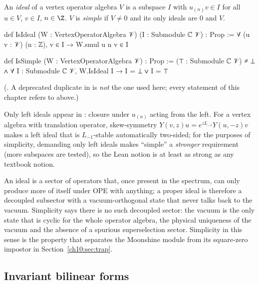 \begin{definition}\label{ch10:def:simple}
An \emph{ideal} of a vertex operator algebra $V$ is a subspace $I$ with $u_{(n)}v\in I$ for all
$u\in V$, $v\in I$, $n\in\Z$.  $V$ is \emph{simple} if $V\neq0$ and its only ideals are $0$ and $V$.
\end{definition}
\begin{leancode}
def IsIdeal (W : VertexOperatorAlgebra 𝒱) (I : Submodule ℂ 𝒱) : Prop :=
  ∀ (u v : 𝒱) (n : ℤ), v ∈ I → W.smul u n v ∈ I

def IsSimple (W : VertexOperatorAlgebra 𝒱) : Prop :=
  (⊤ : Submodule ℂ 𝒱) ≠ ⊥ ∧ ∀ I : Submodule ℂ 𝒱, W.IsIdeal I → I = ⊥ ∨ I = ⊤
\end{leancode}
(.  A deprecated duplicate  in
 is \emph{not} the one used here; every statement of this
chapter refers to  above.)

\begin{dictionary}
Only left ideals appear in : closure under $u_{(n)}$ acting from the left.  For a
vertex algebra with translation operator, skew-symmetry $Y(v,z)u=e^{zL_{-1}}Y(u,-z)v$ makes a left
ideal that is $L_{-1}$-stable automatically two-sided; for the purposes of simplicity, demanding
only left ideals makes ``simple'' a \emph{stronger} requirement (more subspaces are tested), so
the Lean notion is at least as strong as any textbook notion.
\end{dictionary}

\begin{physics}
An ideal is a sector of operators that, once present in the spectrum, can only produce more of itself under OPE with anything; a proper ideal is therefore a decoupled subsector with a vacuum-orthogonal state that never talks back to the vacuum. Simplicity says there is no such decoupled sector: the vacuum is the only state that is cyclic for the whole operator algebra, the physical uniqueness of the vacuum and the absence of a spurious superselection sector. Simplicity in this sense is the property that separates the Moonshine module from its square-zero impostor in Section~\ref{ch10:sec:trap}.
\end{physics}

\subsection{Invariant bilinear forms}

